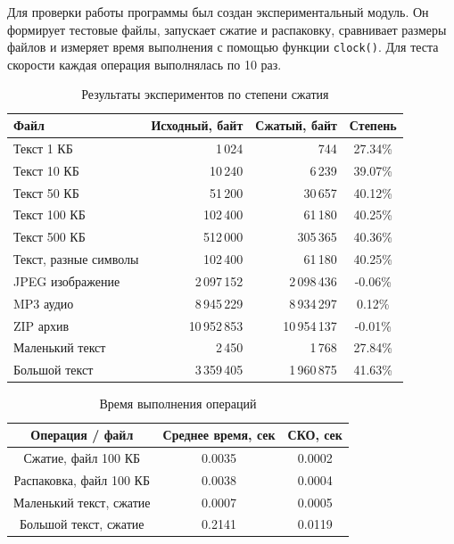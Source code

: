 \documentclass[14pt,a4paper]{extarticle}
\begin{document}
Для проверки работы программы был создан экспериментальный модуль. Он формирует тестовые файлы, запускает сжатие и распаковку, сравнивает размеры файлов и измеряет время выполнения с помощью функции \texttt{clock()}. Для теста скорости каждая операция выполнялась по 10 раз.

\begin{table}[H]
\centering
\caption{Результаты экспериментов по степени сжатия}
\label{tab:results}
\scriptsize
\setlength{\tabcolsep}{2pt}
\renewcommand{\arraystretch}{0.9}
\begin{tabularx}{\textwidth}{|>{\raggedright\arraybackslash}X|r|r|c|}
\hline
\textbf{Файл} & \textbf{Исходный, байт} & \textbf{Сжатый, байт} & \textbf{Степень} \\
\hline
Текст 1 КБ & 1\,024 & 744 & 27.34\% \\
Текст 10 КБ & 10\,240 & 6\,239 & 39.07\% \\
Текст 50 КБ & 51\,200 & 30\,657 & 40.12\% \\
Текст 100 КБ & 102\,400 & 61\,180 & 40.25\% \\
Текст 500 КБ & 512\,000 & 305\,365 & 40.36\% \\
Текст, разные символы & 102\,400 & 61\,180 & 40.25\% \\
JPEG изображение & 2\,097\,152 & 2\,098\,436 & -0.06\% \\
MP3 аудио & 8\,945\,229 & 8\,934\,297 & 0.12\% \\
ZIP архив & 10\,952\,853 & 10\,954\,137 & -0.01\% \\
Маленький текст & 2\,450 & 1\,768 & 27.84\% \\
Большой текст & 3\,359\,405 & 1\,960\,875 & 41.63\% \\
\hline
\end{tabularx}
\end{table}

\begin{table}[H]
\centering
\caption{Время выполнения операций}
\label{tab:speed}
\small
\setlength{\tabcolsep}{4pt}
\renewcommand{\arraystretch}{0.95}
\begin{tabular}{|c|c|c|}
\hline
\textbf{Операция / файл} & \textbf{Среднее время, сек} & \textbf{СКО, сек} \\
\hline
Сжатие, файл 100 КБ & 0.0035 & 0.0002 \\
Распаковка, файл 100 КБ & 0.0038 & 0.0004 \\
Маленький текст, сжатие & 0.0007 & 0.0005 \\
Большой текст, сжатие & 0.2141 & 0.0119 \\
\hline
\end{tabular}
\end{table}
\end{document}
